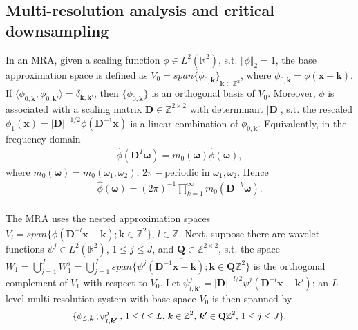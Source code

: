 \subsection{Multi-resolution analysis and critical downsampling}
In an MRA, given a scaling function $\phi\in L^2(\mathbb{R}^2)$, s.t. $\Vert\phi\Vert_2=1$,
the base approximation space is defined as $V_0 = \overline{span\{\phi_{0,\boldsymbol{k}}\}}_{\boldsymbol{k}\in\mathbb{Z}^2}$, where $\phi_{0,\boldsymbol{k}} = \phi(\boldsymbol{x}-\boldsymbol{k})$. If $\langle \phi_{0,\boldsymbol{k}},\phi_{0,\boldsymbol{k'}}\rangle = \delta_{\boldsymbol{k,k'}}$, then $\{\phi_{0,\boldsymbol{k}}\}$ is an orthogonal basis of $V_0$. Moreover, $\phi$ is associated with a scaling matrix $\mathbf{D}\in\mathbb{Z}^{2\times 2}$ with determinant $|\mathbf{D}|$, s.t. the rescaled 
 $\phi_1(\boldsymbol{x}) = |\mathbf{D}|^{-1/2}\phi(\mathbf{D}^{-1}\boldsymbol{x})$ is a linear combination of $\phi_{0,\boldsymbol{k}}$.
Equivalently, in the frequency domain
\begin{align}\label{eq: m0}
\widehat{\phi}(\mathbf{D}^T\boldsymbol{\omega}) = m_0(\boldsymbol{\omega})\widehat{\phi}(\boldsymbol{\omega}),
\end{align}
where $m_0(\boldsymbol{\omega}) = m_0(\omega_1,\omega_2)$, $2\pi-$periodic in $\omega_1,\omega_2$. Hence
\begin{align}\label{eq: phi-m0}
\textstyle \hat{\phi}(\boldsymbol{\omega}) = (2\pi)^{-1}\prod_{k=1}^{\infty}m_0(\mathbf{D}^{-k} \boldsymbol{\omega}).
\end{align}
\\[2em]
The MRA uses the nested approximation spaces $V_l = \overline{span\{\phi(\mathbf{D}^{-l}\boldsymbol{x}-\boldsymbol{k});\boldsymbol{k}\in\mathbb{Z}^2\}},\,l\in\mathbb{Z}$. 
Next, suppose there are wavelet functions $\psi^j\in L^2(\mathbb{R}^2)$, {\small $1 \leq j \leq J$}, and $\mathbf{Q}\in\mathbb{Z}^{2\times2}$, s.t. the space $W_1 = \bigcup_{j=1}^J W_1^j = \bigcup_{j=1}^J \overline{span\{\psi^j(\mathbf{D}^{-1}\boldsymbol{x-k});\boldsymbol{ k}\in \mathbf{Q}\mathbb{Z}^2\}}$ is the orthogonal complement of $V_1$ with respect to $V_0$. Let $\psi^j_{l,\boldsymbol{k'}} = |\mathbf{D}|^{-l/2}\psi^j(\mathbf{D}^{-l}\boldsymbol{x-k'})$; an $L$-level multi-resolution system with base space $V_0$ is then spanned by
 \begin{align}\label{eq: MRA}
 \{\phi_{L,\boldsymbol{k}}\,,\psi^j_{l,\boldsymbol{k'}}\,, \, {\small 1\leq l \leq L,\, \boldsymbol{k}\in \mathbb{Z}^2,\,\boldsymbol{k'}\in \mathbf{Q}\mathbb{Z}^2,\,1\leq j \leq J\}}.
\end{align}  
